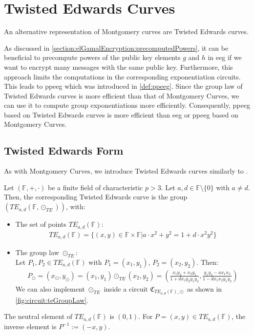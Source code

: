\newpage
\section{Twisted Edwards Curves}
\label{section:ellipticCurves:twistedEdwards}

An alternative representation of Montgomery curves are Twisted Edwards curves.

As discussed in \cref{section:elGamalEncryption:precomputedPowers}, it can be beneficial to precompute powers of the public key elements $g$ and $h$ in \gls{eeg} if we want to encrypt many messages with the same public key.
Furthermore, this approach limits the computations in the corresponding exponentiation circuits.
This leads to \gls{ppeeg} which was introduced in \cref{def:ppeeg}.
Since the group law of Twisted Edwards curves is more efficient than that of Montgomery Curves, we can use it to compute group exponentiations more efficiently.
Consequently, \gls{ppeeg} based on Twisted Edwards curves is more efficient than \gls{eeg} or \gls{ppeeg} based on Montgomery Curves.

\subsection{Twisted Edwards Form}
As with Montgomery Curves, we introduce Twisted Edwards curves similarly to \cite{least_authority_moonmath_2024}.

\begin{definition}
    Let $(\mathbb{F},+,\cdot)$ be a finite field of characteristic $p>3$. Let $a, d\in\mathbb{F}\setminus\{0\}$ with $a\neq d$.
    Then, the corresponding Twisted Edwards curve is the group $(TE_{a,d}(\mathbb{F}, \odot_{TE}))$, with:
    \begin{itemize}
        \item The set of points $TE_{a,d}(\mathbb{F})$:
        \begin{align*}
            TE_{a,d}(\mathbb{F})=\{(x,y)\in\mathbb{F}\times\mathbb{F}|a\cdot x^2+y^2=1+d\cdot x^2y^2\}
        \end{align*}
        \item The group law $\odot_{TE}$:\\
        Let $P_1, P_2\in TE_{a,d}(\mathbb{F})$ with $P_1=(x_1,y_1)$, $P_2=(x_2, y_2)$. Then:
        \begin{align*}
            P_\odot=(x_\odot, y_\odot)=(x_1, y_1)\odot_{TE} (x_2, y_2)=\left(\frac{x_1y_2+x_2y_1}{1+dx_1y_2y_1y_2},\frac{y_1y_2-ax_1x_2}{1-dx_1x_2y_1y_2}\right)
        \end{align*}
        We can also implement $\odot_{TE}$ inside a circuit $\mathfrak{C}_{TE_{a,d}(\mathbb{F})\_\odot}$ as shown in \cref{fig:circuit:teGroupLaw}.
    \end{itemize}
    The neutral element of $TE_{a,d}(\mathbb{F})$ is $(0,1)$. For $P=(x,y)\in TE_{a,d}(\mathbb{F})$, the inverse element is $P^{-1}:=(-x,y)$.
\end{definition}

